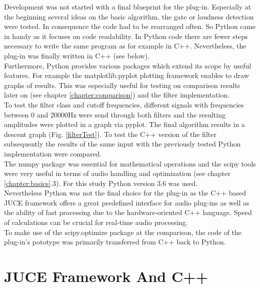 Development was not started with a final blueprint for the plug-in. Especially at the beginning several ideas on the basic algorithm, the gate or loudness detection were tested. In consequence the code had to be rearranged often. So Python came in handy as it focuses on code readability. In Python code there are fewer steps necessary to write the same program as for example in C++. Nevertheless, the plug-in was finally written in C++ (see below).\\
Furthermore, Python provides various packages which extend its scope by useful features. For example the matplotlib.pyplot\cite{MPlot} plotting framework enables to draw graphs of results. This was especially useful for testing on comparison results later on (see chapter \ref{chapter:comparison}) and the filter implementation.\\
To test the filter class and cutoff frequencies, different signals with frequencies between 0 and 20000Hz were send through both filters and the resulting amplitudes were plotted in a graph via pyplot. The final algorithm results in a descent graph (Fig. \ref{filterTest}). To test the C++ version of the filter subsequently the results of the same input with the previously tested Python implementation were compared.\\
The numpy\cite{numpy} package was essential for mathematical operations and the scipy\cite{scipy} tools were very useful in terms of audio handling and optimization (see chapter \ref{chapter:basics}.3). For this study Python version 3.6 was used.\\
Nevertheless Python was not the final choice for the plug-in as the C++ based JUCE framework offers a great predefined interface for audio plug-ins as well as the ability of fast processing due to the hardware-oriented C++ language. Speed of calculations can be crucial for real-time audio processing.\\
To make use of the scipy.optimize package at the comparison, the code of the plug-in's pototype was primarily transferred from C++ back to Python.\\

\section{JUCE Framework And C++}

